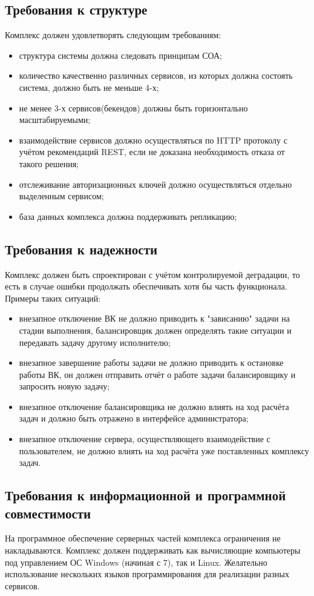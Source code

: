 \documentclass[a4paper,12pt]{report}
\numberwithin{equation}{section}
\begin{document}
\subsection{Требования к структуре}
Комплекс должен удовлетворять следующим требованиям:
\begin{itemize}
  \item структура системы должна следовать принципам СОА;
  \item количество качественно различных сервисов, из которых должна состоять система, должно быть не меньше 4-х;
  \item не менее 3-х сервисов(бекендов) должны быть горизонтально масштабируемыми;
  \item взаимодействие сервисов должно осуществляться по HTTP протоколу с учётом рекомендаций REST, если не доказана необходимость отказа от такого решения;
  \item отслеживание авторизационных ключей должно осуществляться отдельно выделенным сервисом;
  \item база данных комплекса должна поддерживать репликацию; 
\end{itemize}

\subsection{Требования к надежности}
Комплекс должен быть спроектирован с учётом контролируемой деградации, то есть в случае ошибки продолжать обеспечивать хотя бы часть функционала. Примеры таких ситуаций:
\begin{itemize}
  \item внезапное отключение ВК не должно приводить к "зависанию" задачи на стадии выполнения, балансировщик должен определять такие ситуации и передавать задачу другому исполнителю;
  \item внезапное завершение работы задачи не должно приводить к остановке работы ВК, он должен отправить отчёт о работе задачи балансировщику и запросить новую задачу;
  \item внезапное отключение балансировщика не должно влиять на ход расчёта задач и должно быть отражено в интерфейсе администратора;
  \item внезапное отключение сервера, осуществляющего взаимодействие с пользователем, не должно влиять на ход расчёта уже поставленных комплексу задач.
\end{itemize}

\subsection{Требования к информационной и программной совместимости}
На программное обеспечение серверных частей комплекса ограничения не накладываются.
Комплекс должен поддерживать как вычисляющие компьютеры под управлением ОС Windows (начиная с 7), так и Linux.
Желательно использование нескольких языков программирования для реализации разных сервисов.
\end{document}
